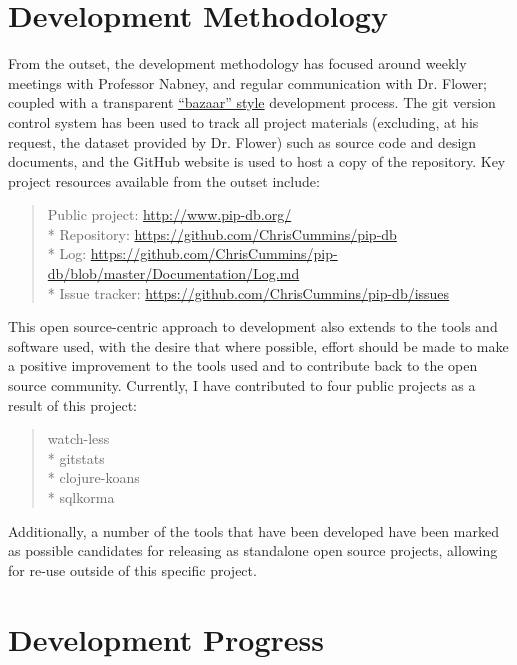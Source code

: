 \documentclass[12pt,a4paper]{article}
\begin{document}
\section{Development Methodology}

From the outset, the development methodology has focused around weekly
meetings with Professor Nabney, and regular communication with
Dr. Flower; coupled with a transparent
\href{http://www.catb.org/esr/writings/cathedral-bazaar/}{``bazaar''
  style} development process. The git version control system has been
used to track all project materials (excluding, at his request, the
dataset provided by Dr. Flower) such as source code and design
documents, and the GitHub website is used to host a copy of the
repository. Key project resources available from the outset include:

\begin{quote}
Public project: \url{http://www.pip-db.org/}\\*
Repository: \url{https://github.com/ChrisCummins/pip-db}\\*
Log: \url{https://github.com/ChrisCummins/pip-db/blob/master/Documentation/Log.md}\\*
Issue tracker: \url{https://github.com/ChrisCummins/pip-db/issues}
\end{quote}

This open source-centric approach to development also extends to the
tools and software used, with the desire that where possible, effort
should be made to make a positive improvement to the tools used and to
contribute back to the open source community. Currently, I have
contributed to four public projects as a result of this project:

\begin{quote}
watch-less\\*
gitstats\\*
clojure-koans\\*
sqlkorma
\end{quote}

Additionally, a number of the tools that have been developed have been
marked as possible candidates for releasing as standalone open source
projects, allowing for re-use outside of this specific project.

\section{Development Progress}
\end{document}
